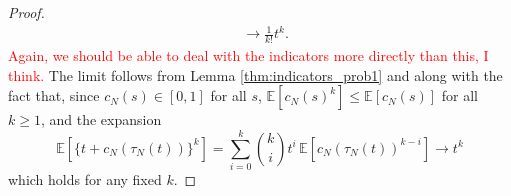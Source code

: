 \documentclass{article}
\newcommand{\seb}[1]{\xspace\textcolor{red}{#1}\xspace}
\newcommand{\E}{\mathbb{E}}
\newcommand{\1}[1]{\mathbbm{1}_{#1}}
\begin{document}
\begin{proof}
\begin{align}
&\longrightarrow \frac{1}{k!} t^k . \label{eq:19a}
\end{align}
\seb{Again, we should be able to deal with the indicators more directly than this, I think.}
The limit follows from Lemma \ref{thm:indicators_prob1} and \citet[Equations (3.3)--(3.4)]{brown2021} along with the fact that, since $c_N(s) \in [0,1]$ for all $s$, $\E[c_N(s)^k] \leq \E[c_N(s)]$ for all $k\geq 1$, and the expansion
\begin{equation}\label{eq:11}
\E\left[ \{t+ c_N(\tau_N(t)) \}^k \right]
=\sum_{i=0}^k \binom{k}{i} t^i \,
\E\left[ c_N(\tau_N(t))^{k-i} \right]
\longrightarrow t^k 
\end{equation}
which holds for any fixed $k$.


\end{proof}
\end{document}
